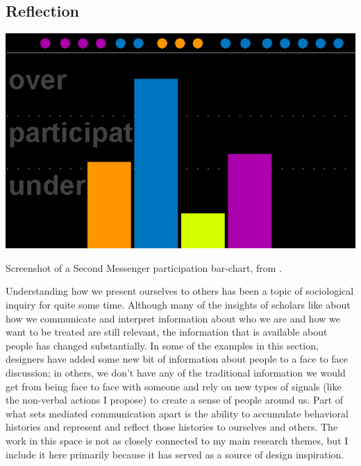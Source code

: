 \documentclass{tufte-handout}
\begin{document}

\subsection{Reflection}

\begin{marginfigure}
	\includegraphics{figures/second-messenger.png}
	\caption{Screenshot of a Second Messenger participation bar-chart, from \citep{DiMicco:2007ie}.}
	\label{fig:second-messenger}
\end{marginfigure}





Understanding how we present ourselves to others has been a topic of sociological inquiry for quite some time. Although many of the insights of scholars like \citet{goffman_presentation_1959} about how we communicate and interpret information about who we are and how we want to be treated are still relevant, the information that is available about people has changed substantially. In some of the examples in this section, designers have added some new bit of information about people to a face to face discussion; in others, we don't have any of the traditional information we would get from being face to face with someone and rely on new types of signals (like the non-verbal actions I propose) to create a sense of people around us. Part of what sets mediated communication apart is the ability to accumulate behavioral histories and represent and reflect those histories to ourselves and others. The work in this space is not as closely connected to my main research themes, but I include it here primarily because it has served as a source of design inspiration. 
\end{document}
